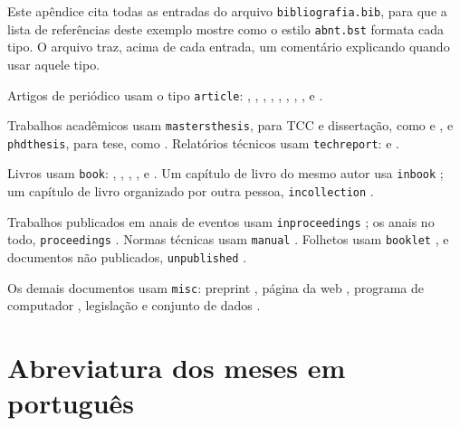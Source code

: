 \documentclass[tcc,capa]{texufpel}
\begin{document}
Este apêndice cita todas as entradas do arquivo \texttt{bibliografia.bib},
para que a lista de referências deste exemplo mostre como o estilo
\texttt{abnt.bst} formata cada tipo. O arquivo traz, acima de cada entrada, um
comentário explicando quando usar aquele tipo.

Artigos de periódico usam o tipo \texttt{article}:
\citet{Turing:1937:OCN}, \citet{Turing:1950:CMI}, \citet{Shannon:1948:MTC},
\citet{Dijkstra:1959:NTP}, \citet{Dijkstra:1968:GTS}, \citet{Hoare:1969:ABC},
\citet{Codd:1970:RMD}, \citet{Lamport:1978:TCO},
\citet{Dantzig:1959:TDP} e \citet{Solomon:1987:AVR}.

Trabalhos acadêmicos usam \texttt{mastersthesis}, para TCC e dissertação, como
\citet{Cruz:2015:FCS} e \citet{Shannon:1940:SAR}, e \texttt{phdthesis}, para
tese, como \citet{Turing:1938:SLO}. Relatórios técnicos usam
\texttt{techreport}: \citet{vonNeumann:1945:FDR} e \citet{Postel:1981:IP}.

Livros usam \texttt{book}: \citet{vonNeumann:1966:TSR},
\citet{Knuth:1997:ACP}, \citet{Cormen:2022:IA}, \citet{Brooks:1975:MMM},
\citet{Abelson:1996:SIC} e \citet{Moore:1979:MAI}. Um capítulo de livro do
mesmo autor usa \texttt{inbook} \citep{Knuth:1997:IS}; um capítulo de livro
organizado por outra pessoa, \texttt{incollection}
\citep{vonNeumann:1951:GLT}.

Trabalhos publicados em anais de eventos usam \texttt{inproceedings}
\citep{Cook:1971:CTP}; os anais no todo, \texttt{proceedings}
\citep{ACM:1971:STOC}. Normas técnicas usam \texttt{manual}
\citep{ABNT:2018:NBR6023}. Folhetos usam \texttt{booklet}
\citep{Zorzo:2017:RFC}, e documentos não publicados, \texttt{unpublished}
\citep{Dijkstra:1988:CRT}.

Os demais documentos usam \texttt{misc}: preprint
\citep{Vaswani:2017:AIA}, página da web \citep{ACM:2026:TA}, programa de
computador \citep{Aguiar:2026:TEX}, legislação \citep{Brasil:2015:LBI} e
conjunto de dados \citep{Fisher:1936:IRI}.

\anexos

\chapter{Abreviatura dos meses em português}
\label{anx:meses}
\end{document}
